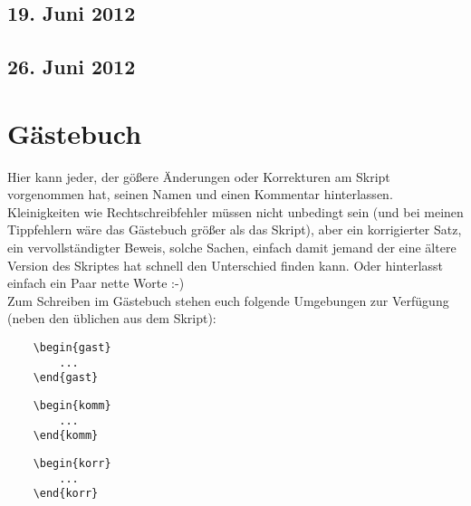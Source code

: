 \documentclass[a4paper,12pt]{report}
\theoremstyle{break}
\theoremstyle{nonumberbreak}
\newtheorem{gast}{G\"astebucheintrag}
\newtheorem{komm}{Kommentar}
\newtheorem{korr}{Korrktur}
\theoremstyle{nonumberplain}
\begin{document}
\section{19. Juni 2012}
\setcounter{Aufg}{0}
\setcounter{Loes}{0}

\newpage
\section{26. Juni 2012}
\setcounter{Aufg}{0}
\setcounter{Loes}{0}




\chapter{G\"astebuch}
Hier kann jeder, der g\"o\ss ere \"Anderungen oder Korrekturen am Skript vorgenommen hat, seinen Namen und einen Kommentar hinterlassen. Kleinigkeiten wie Rechtschreibfehler m\"ussen nicht unbedingt sein (und bei meinen Tippfehlern w\"are das G\"astebuch gr\"o\ss er als das Skript), aber ein korrigierter Satz, ein vervollst\"andigter Beweis, solche Sachen, einfach damit jemand der eine \"altere Version des Skriptes hat schnell den Unterschied finden kann. Oder hinterlasst einfach ein Paar nette Worte :-)\\
Zum Schreiben im G\"astebuch stehen euch folgende Umgebungen zur Verf\"ugung (neben den \"ublichen aus dem Skript):
\begin{center}\begin{minipage}{0.3\textwidth}\begin{verbatim}
	\begin{gast}
		...
	\end{gast}
\end{verbatim}\end{minipage}
\begin{minipage}{0.3\textwidth}\begin{verbatim}	
	\begin{komm}
		...	
	\end{komm}
\end{verbatim}\end{minipage}
\begin{minipage}{0.3\textwidth}\begin{verbatim}	
	\begin{korr}
		...	
	\end{korr}
\end{verbatim}\end{minipage}\end{center}
\end{document}
